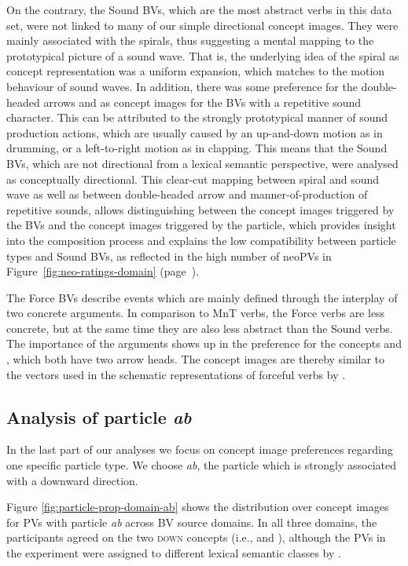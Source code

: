 \documentclass[output=paper]{langsci/langscibook}
\begin{document}
On the contrary, the Sound BVs, which are the most abstract
verbs in this data set, were not linked to many of our simple
directional concept images. They were mainly associated with the spirals, thus
suggesting a mental mapping to the prototypical picture of a sound
wave. That is, the underlying idea of the spiral as concept
representation was a uniform expansion, which matches to the motion
behaviour of sound waves. In addition, there was some preference for
the double-headed arrows  and  as
concept images for the BVs with a repetitive sound character. This can be
attributed to the strongly prototypical manner of sound production
actions, which are usually caused by an up-and-down motion as in
drumming, or a left-to-right motion as in clapping. This means that
the Sound BVs, which are not directional from a lexical
semantic perspective, were analysed as conceptually directional. This
clear-cut mapping between spiral and sound wave as well as between
double-headed arrow and manner-of-production of repetitive sounds,
allows distinguishing between the concept images triggered by the BVs and the concept images
triggered by the particle, which provides insight into the composition
process and explains the low compatibility between particle types and
Sound BVs, as reflected in the high number of neoPVs in
Figure~\ref{fig:neo-ratings-domain} (page~\pageref{fig:neo-ratings-domain}).

The Force BVs describe events which are mainly defined
through the interplay of two concrete arguments. In comparison to
MnT verbs, the Force verbs are less concrete, but at
the same time they are also less abstract than the Sound
verbs. The importance of the arguments shows up in the preference for
the concepts  and , which both have
two arrow heads. The concept images are thereby similar to the vectors used in
the schematic representations of forceful verbs by \cite{Zwarts:10}.

\subsection{Analysis of particle \textit{ab}}
\label{sec:disc-ab}\largerpage

In the last part of our analyses we focus on concept image preferences
regarding one specific particle type. We choose \textit{ab}, the
particle which is strongly associated with a downward direction.

Figure \ref{fig:particle-prop-domain-ab} shows the distribution over
concept images for PVs with particle \textit{ab} across BV source
domains. In all three domains, the participants agreed on the two
\textsc{down} concepts (i.e.,  and
), although the PVs in the experiment were
assigned to different lexical semantic classes by \cite{Kliche:11}.
\end{document}
